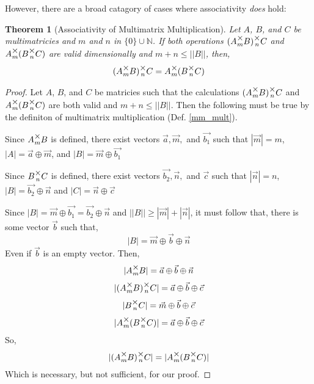 \documentclass[12pt]{book}
\theoremstyle{plain}
\newtheorem{theorem}{Theorem}[chapter]
\theoremstyle{definition}
\theoremstyle{ppart}
\theoremstyle{case}
\theoremstyle{solution}
\newcommand{\mmult}[1]{\text{\raisebox{1ex}{$\underset{#1}{\times}$}}}
\begin{document}
However, there are a broad catagory of cases where associativity \textit{does} hold:

\begin{theorem}[Associativity of Multimatrix Multiplication]
\label{mm_associativity}
Let $A$, $B$, and $C$ be multimatricies and $m$ and $n$ in
$\{0\} \cup \mathbb{N}$.
If both operations $(A \mmult{m} B) \mmult{n} C$ and $A \mmult{m} (B \mmult{n} C)$
are valid dimensionally and $m+n \le ||B||$, then,
\[ (A \mmult{m} B) \mmult{n} C = A \mmult{m} (B \mmult{n} C) \]
\end{theorem}
\begin{proof}
Let $A$, $B$, and $C$ be matricies such that the calculations
$(A \mmult{m} B) \mmult{n} C$ and $A \mmult{m} (B \mmult{n} C)$ are both valid
and $m + n \le ||B||$.
Then the following must be true by the definiton of multimatrix multiplication
(Def. \ref{mm_mult}).

Since $A \mmult{m} B$ is defined, there exist vectors $\vec{a}, \vec{m},$ and
$\vec{b_1}$ such that 
$|\vec{m}| = m$,
$|A| = \vec{a} \oplus \vec{m}$,
and
$|B| = \vec{m} \oplus \vec{b_1}$

Since $B \mmult{n} C$ is defined, there exist vectors $\vec{b_2}, \vec{n},$ and
$\vec{c}$ such that
$|\vec{n}| = n$,
$|B| = \vec{b_2} \oplus \vec{n}$
and
$|C| = \vec{n} \oplus \vec{c}$

Since $|B| = \vec{m} \oplus \vec{b_1} = \vec{b_2} \oplus \vec{n}$ and
$||B|| \ge |\vec{m}| + |\vec{n}|$, it must follow that, there is some vector $\vec{b}$
such that,
\[
 |B| = \vec{m} \oplus \vec{b} \oplus \vec{n}
\]
Even if $\vec{b}$ is an empty vector. Then,
\[ |A \mmult{m} B| = \vec{a} \oplus \vec{b} \oplus \vec{n} \]
\[ |(A \mmult{m} B) \mmult{n} C| = \vec{a} \oplus \vec{b} \oplus \vec{c} \]
\[ |B \mmult{n} C| = \vec{m} \oplus \vec{b} \oplus \vec{c} \]
\[ |A \mmult{m} (B \mmult{n} C)| = \vec{a} \oplus \vec{b} \oplus \vec{c} \]
So,
\[ |(A \mmult{m} B) \mmult{n} C| = |A \mmult{m} (B \mmult{n} C)| \]
Which is necessary, but not sufficient, for our proof.


\end{proof}
\end{document}
